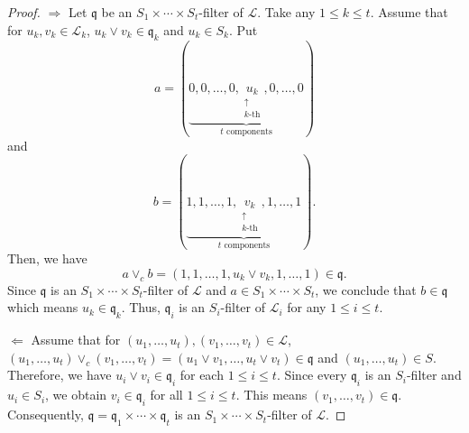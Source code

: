 \documentclass[10pt,a4paper]{amsart}
\begin{document}
\begin{proof}
$\Longrightarrow$ Let $\mathfrak{q}$ be an $S_1 \times \cdots \times S_t$-filter of $\mathscr{L}$. Take any $1 \le k \le t$. Assume that for $u_k,v_k \in \mathscr{L}_k$, $u_k \vee v_k \in \mathfrak{q}_k$  and $u_k \in S_k$. Put 
\[a = ( \underbrace{0, 0, \dots, 0, \underset{\substack{\uparrow \\ k\text{-th}}}{u_k}, 0, \dots, 0}_{t \text{ components}} )\]
and
\[b = ( \underbrace{1, 1, \dots, 1, \underset{\substack{\uparrow \\ k\text{-th}}}{v_k}, 1, \dots, 1}_{t \text{ components}} ).\]
Then, we have 
\[a \vee_c b=(1, 1, \dots, 1,  u_k \vee v_k , 1, \dots, 1) \in \mathfrak{q}.\]
Since $\mathfrak{q}$ is an $S_1 \times \cdots \times S_t$-filter of $\mathscr{L}$ and $a \in S_1 \times \cdots \times S_t$, we conclude that $b \in \mathfrak{q}$ which means $u_k \in \mathfrak{q}_k$. Thus, $\mathfrak{q}_i$ is an $S_i$-filter of $\mathscr{L}_i$ for any $1 \le i \le t$.

$\Longleftarrow$ Assume that for $(u_1,\ldots,u_t),(v_1,\ldots,v_t) \in  \mathscr{L}$, $(u_1,\ldots,u_t) \vee _c(v_1,\ldots,v_t)=(u_1 \vee v_1,\ldots,u_t \vee v_t) \in \mathfrak{q}$ and $(u_1,\ldots,u_t) \in S$. Therefore, we have $u_i \vee v_i \in \mathfrak{q}_i$ for each $1 \leq i \leq t$. Since every $ \mathfrak{q}_i$ is an $S_i$-filter and $u_i \in S_i$, we obtain $v_i \in  \mathfrak{q}_i$ for all $1 \leq i \leq t$. This means $(v_1,\ldots,v_t) \in \mathfrak{q}$. Consequently, $\mathfrak{q}= \mathfrak{q}_1 \times \cdots \times  \mathfrak{q}_t$ is an $S_1 \times \cdots \times S_t$-filter of $\mathscr{L}$.
\end{proof}
\end{document}
